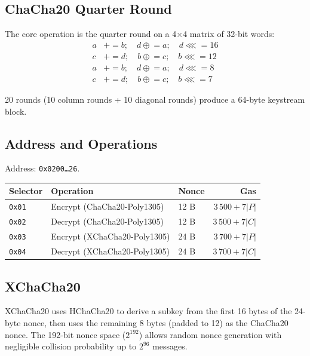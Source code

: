 \documentclass[11pt,a4paper]{article}
\begin{document}
\subsection{ChaCha20 Quarter Round}

The core operation is the quarter round on a 4$\times$4 matrix of 32-bit words:
\begin{align}
  a &\mathrel{+}= b; \quad d \mathrel{\oplus}= a; \quad d \mathrel{\lll}= 16 \\
  c &\mathrel{+}= d; \quad b \mathrel{\oplus}= c; \quad b \mathrel{\lll}= 12 \\
  a &\mathrel{+}= b; \quad d \mathrel{\oplus}= a; \quad d \mathrel{\lll}= 8 \\
  c &\mathrel{+}= d; \quad b \mathrel{\oplus}= c; \quad b \mathrel{\lll}= 7
\end{align}

20 rounds (10 column rounds + 10 diagonal rounds) produce a 64-byte keystream block.

\subsection{Address and Operations}

Address: \texttt{0x0200\ldots26}.

\begin{table}[H]
\centering
\begin{tabular}{lllr}
\toprule
\textbf{Selector} & \textbf{Operation} & \textbf{Nonce} & \textbf{Gas} \\
\midrule
\texttt{0x01} & Encrypt (ChaCha20-Poly1305) & 12 B & $3\,500 + 7|P|$ \\
\texttt{0x02} & Decrypt (ChaCha20-Poly1305) & 12 B & $3\,500 + 7|C|$ \\
\texttt{0x03} & Encrypt (XChaCha20-Poly1305) & 24 B & $3\,700 + 7|P|$ \\
\texttt{0x04} & Decrypt (XChaCha20-Poly1305) & 24 B & $3\,700 + 7|C|$ \\
\bottomrule
\end{tabular}
\end{table}

\subsection{XChaCha20}

XChaCha20 uses HChaCha20 to derive a subkey from the first 16 bytes of the
24-byte nonce, then uses the remaining 8 bytes (padded to 12) as the ChaCha20
nonce. The 192-bit nonce space ($2^{192}$) allows random nonce generation
with negligible collision probability up to $2^{96}$ messages.
\end{document}
